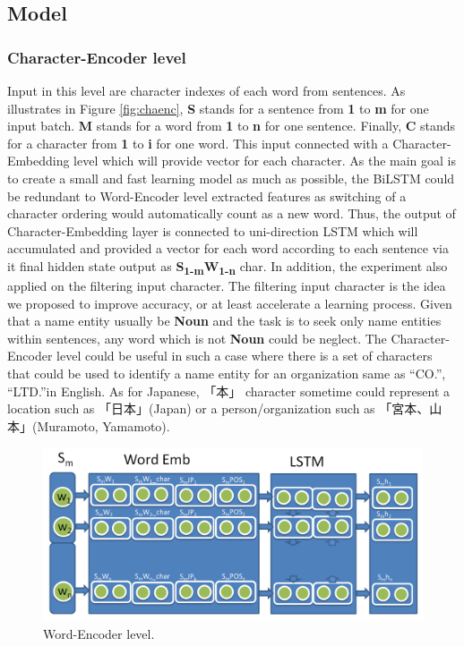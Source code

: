 \begin{CJK*}{UTF8}{min}
\subsection{Model}
\subsubsection{Character-Encoder level}
Input in this level are character indexes of each word from sentences.
As illustrates in Figure \ref{fig:chaenc}, \textbf{S} stands for a sentence from \textbf{1} to \textbf{m} for one input batch.
\textbf{M} stands for a word from \textbf{1} to \textbf{n} for one sentence.
Finally, \textbf{C} stands for a character from \textbf{1} to \textbf{i} for one word.
This input connected with a Character-Embedding level which will provide vector for each character.
As the main goal is to create a small and fast learning model as much as possible, the BiLSTM could be redundant to Word-Encoder level extracted features as switching of a character ordering would automatically count as a new word.
Thus, the output of Character-Embedding layer is connected to uni-direction LSTM which will accumulated and provided a vector for each word according to each sentence via it final hidden state output as \textbf{S\textsubscript{1-m}W\textsubscript{1-n}} char.
In addition, the experiment also applied on the filtering input character.
The filtering input character is the idea we proposed to improve accuracy, or at least accelerate a learning process.
Given that a name entity usually be \textbf{Noun} and the task is to seek only name entities within sentences, any word which is not \textbf{Noun} could be neglect.
The Character-Encoder level could be useful in such a case where there is a set of characters that could be used to identify a name entity for an organization same as ``CO.'', ``LTD.''in English.
As for Japanese, 「本」 character sometime could represent a location such as 「日本」(Japan) or a person/organization such as 「宮本、山本」(Muramoto, Yamamoto).


\begin{figure}[!h]
\centering
  \includegraphics[scale=0.3]{word_encoder.png}
  \caption{Word-Encoder level.}
  \label{fig:winenc}
\end{figure}



\end{CJK*}
